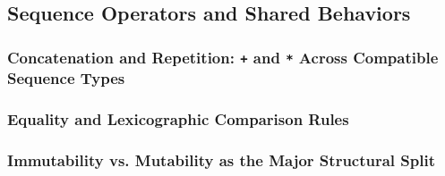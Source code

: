 \subsection{Sequence Operators and Shared Behaviors}
\subsubsection{Concatenation and Repetition: \texttt{+} and \texttt{*} Across Compatible Sequence Types}
\subsubsection{Equality and Lexicographic Comparison Rules}
\subsubsection{Immutability vs. Mutability as the Major Structural Split}
